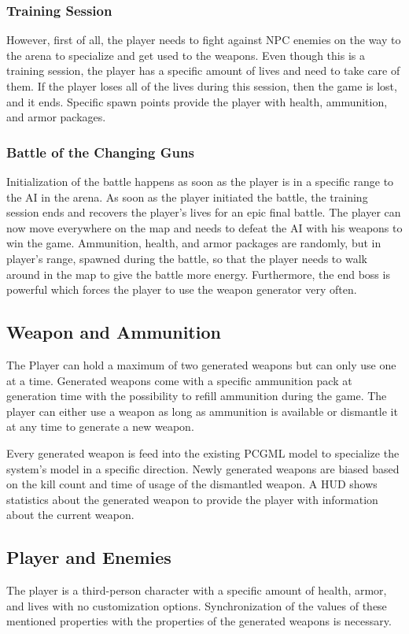 \documentclass[MGS,Master,english]{twbook}%
\begin{document}
\subsubsection{Training Session}
However, first of all, the player needs to fight against NPC enemies on the way to the arena to specialize and get used to the weapons. Even though this is a training session, the player has a specific amount of lives and need to take care of them. If the player loses all of the lives during this session, then the game is lost, and it ends. Specific spawn points provide the player with health, ammunition, and armor packages.

\subsubsection{Battle of the Changing Guns}
Initialization of the battle happens as soon as the player is in a specific range to the AI in the arena. As soon as the player initiated the battle, the training session ends and recovers the player's lives for an epic final battle. The player can now move everywhere on the map and needs to defeat the AI with his weapons to win the game. Ammunition, health, and armor packages are randomly, but in player's range, spawned during the battle, so that the player needs to walk around in the map to give the battle more energy. Furthermore, the end boss is powerful which forces the player to use the weapon generator very often. 

\subsection{Weapon and Ammunition}
The Player can hold a maximum of two generated weapons but can only use one at a time. Generated weapons come with a specific ammunition pack at generation time with the possibility to refill ammunition during the game. The player can either use a weapon as long as ammunition is available or dismantle it at any time to generate a new weapon.

Every generated weapon is feed into the existing PCGML model to specialize the system’s model in a specific direction. Newly generated weapons are biased based on the kill count and time of usage of the dismantled weapon. A \ac{HUD} shows statistics about the generated weapon to provide the player with information about the current weapon. 

\subsection{Player and Enemies}
The player is a third-person character with a specific amount of health, armor, and lives with no customization options. Synchronization of the values of these mentioned properties with the properties of the generated weapons is necessary.
\end{document}
